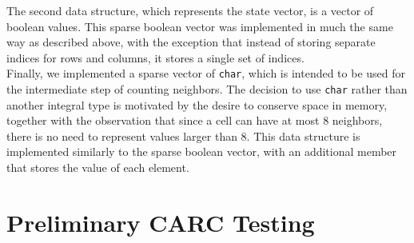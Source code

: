 \documentclass[12pt]{article}
\begin{document}
The second data structure, which represents the state vector, is a vector of boolean values. This sparse boolean vector was implemented in much the same way as described above, with the exception that instead of storing separate indices for rows and columns, it stores a single set of indices. \\

Finally, we implemented a sparse vector of \texttt{char}, which is intended to be used for the intermediate step of counting neighbors. The decision to use \texttt{char} rather than another integral type is motivated by the desire to conserve space in memory, together with the observation that since a cell can have at most 8 neighbors, there is no need to represent values larger than 8. This data structure is implemented similarly to the sparse boolean vector, with an additional member that stores the value of each element.

\section{Preliminary CARC Testing}

\printbibliography[
heading=bibintoc,
title={References}
]
\end{document}
